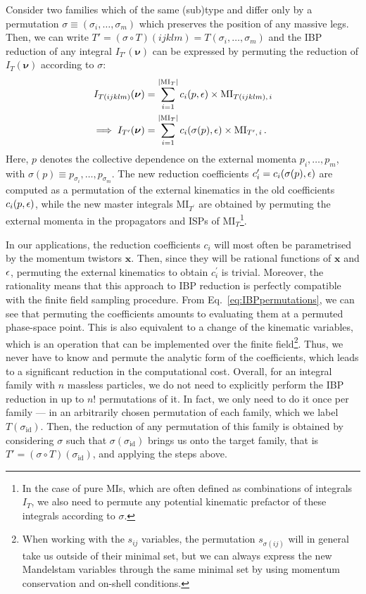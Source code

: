 \documentclass[main.tex]{subfiles}
\begin{document}
Consider two families which of the same (sub)type and differ only by a permutation $\sigma \equiv (\sigma_i, \ldots, \sigma_m)$ which preserves the position of any massive legs. Then, we can write $T'=(\sigma \circ T)(ijklm) = T(\sigma_i, \ldots, \sigma_m)$ and the IBP reduction of any integral $I_{T'}(\bm{\nu})$ can be expressed by permuting the reduction of $I_T(\bm{\nu})$ according to $\sigma$:
\begin{align} \label{eq:IBPpermutations}
    I_{T(ijklm)}(\bm{\nu}) &= \sum_{i=1}^{|\text{MI}_T|} c_i(p, \epsilon) \times \text{MI}_{T(ijklm),\,i} \nonumber \\
    \implies I_{T'}(\bm{\nu}) &= \sum_{i=1}^{|\text{MI}_T|} c_i(\sigma(p), \epsilon) \times \text{MI}_{T^\prime,\,i}\,.
\end{align}
Here, $p$ denotes the collective dependence on the external momenta $p_i, \ldots, p_m$, with $\sigma(p) \equiv p_{\sigma_i}, \ldots, p_{\sigma_m}$. The new reduction coefficients $c^\prime_i = c_i(\sigma(p), \epsilon)$ are computed as a permutation of the external kinematics in the old coefficients $c_i(p, \epsilon)$, while the new master integrals MI$_{T^\prime}$ are obtained by permuting the external momenta in the propagators and ISPs of MI$_T$\footnote{In the case of pure MIs, which are often defined as combinations of integrals $I_T$, we also need to permute any potential kinematic prefactor of these integrals according to $\sigma$.}.

In our applications, the reduction coefficients $c_i$ will most often be parametrised by the momentum twistors $\mathbf{x}$. Then, since they will be rational functions of $\mathbf{x}$ and $\epsilon$, permuting the external kinematics to obtain $c_i^\prime$ is trivial. Moreover, the rationality means that this approach to IBP reduction is perfectly compatible with the finite field sampling procedure. From Eq.~\ref{eq:IBPpermutations}, we can see that permuting the coefficients amounts to evaluating them at a permuted phase-space point. This is also equivalent to a change of the kinematic variables, which is an operation that can be implemented over the finite field\footnote{When working with the $s_{ij}$ variables, the permutation $s_{\sigma(ij)}$ will in general take us outside of their minimal set, but we can always express the new Mandelstam variables through the same minimal set by using momentum conservation and on-shell conditions.}. Thus, we never have to know and permute the analytic form of the coefficients, which leads to a significant reduction in the computational cost. Overall, for an integral family with $n$ massless particles, we do not need to explicitly perform the IBP reduction in up to $n!$ permutations of it. In fact, we only need to do it once per family --- in an arbitrarily chosen permutation of each family, which we label $T(\sigma_\text{id})$. Then, the reduction of any permutation of this family is obtained by considering $\sigma$ such that $\sigma(\sigma_\text{id})$ brings us onto the target family, that is $T' = (\sigma \circ T)(\sigma_\text{id})$, and applying the steps above.
\end{document}
